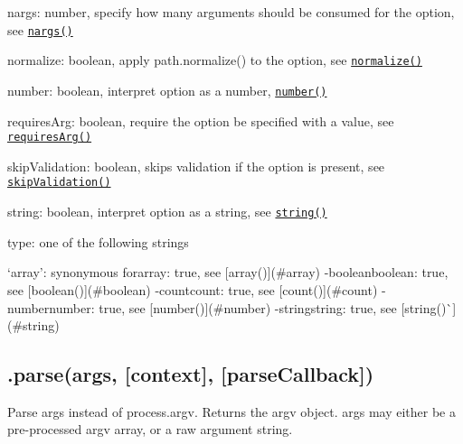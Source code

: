 \begin{DoxyItemize}
\item {\ttfamily nargs}\+: number, specify how many arguments should be consumed for the option, see \href{#nargs}{\tt {\ttfamily nargs()}}
\item {\ttfamily normalize}\+: boolean, apply {\ttfamily path.\+normalize()} to the option, see \href{#normalize}{\tt {\ttfamily normalize()}}
\item {\ttfamily number}\+: boolean, interpret option as a number, \href{#number}{\tt {\ttfamily number()}}
\item {\ttfamily requires\+Arg}\+: boolean, require the option be specified with a value, see \href{#requiresArg}{\tt {\ttfamily requires\+Arg()}}
\item {\ttfamily skip\+Validation}\+: boolean, skips validation if the option is present, see \href{#skipValidation}{\tt {\ttfamily skip\+Validation()}}
\item {\ttfamily string}\+: boolean, interpret option as a string, see \href{#string}{\tt {\ttfamily string()}}
\item {\ttfamily type}\+: one of the following strings
\begin{DoxyItemize}
\item `\textquotesingle{}array'{\ttfamily \+: synonymous for}array\+: true{\ttfamily , see \mbox{[}}array(){\ttfamily \mbox{]}(\#array) -\/}\textquotesingle{}booleanboolean\+: true{\ttfamily , see \mbox{[}}boolean(){\ttfamily \mbox{]}(\#boolean) -\/}\textquotesingle{}countcount\+: true{\ttfamily , see \mbox{[}}count(){\ttfamily \mbox{]}(\#count) -\/}\textquotesingle{}numbernumber\+: true{\ttfamily , see \mbox{[}}number(){\ttfamily \mbox{]}(\#number) -\/}\textquotesingle{}stringstring\+: true{\ttfamily , see \mbox{[}}string()\`{}\mbox{]}(\#string)
\end{DoxyItemize}
\end{DoxyItemize}

\subsection*{.parse(args, \mbox{[}context\mbox{]}, \mbox{[}parse\+Callback\mbox{]}) }

Parse {\ttfamily args} instead of {\ttfamily process.\+argv}. Returns the {\ttfamily argv} object. {\ttfamily args} may either be a pre-\/processed argv array, or a raw argument string.

